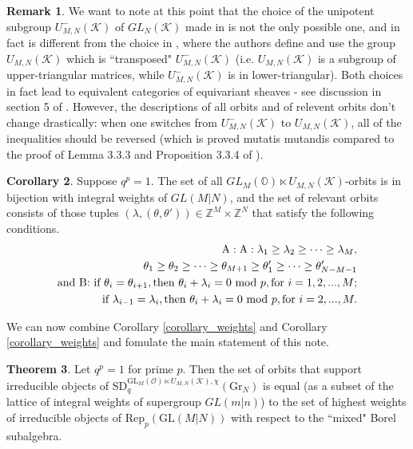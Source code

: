 \documentclass[12pt]{amsart}
\numberwithin{equation}{section}
\numberwithin{equation}{section}
\theoremstyle{definition}
\newtheorem{theorem}{Theorem}
\newtheorem{corollary}[theorem]{Corollary}
\newtheorem{remark}[theorem]{Remark}
\begin{document}
\begin{remark}
    We want to note at this point that the choice of the unipotent subgroup $U_{M,N}^-(\mathcal{K})$ of $GL_N(\mathcal{K})$ made in \cite{ty} is not the only possible one, and in fact is different from the choice in \cite{ty_untwisted}, where the authors define and use the group $U_{M,N}(\mathcal{K})$ which is ``transposed" $U_{M,N}^-(\mathcal{K})$ (i.e. $U_{M,N}(\mathcal{K})$ is a subgroup of upper-triangular matrices, while $U_{M,N}^-(\mathcal{K})$ is in lower-triangular). Both choices in fact lead to equivalent categories of equivariant sheaves - see discussion in section 5 of \cite{ty_untwisted}. However, the descriptions of all orbits and of relevent orbits don't change drastically: when one switches from $U_{M,N}^-(\mathcal{K})$ to $U_{M,N}(\mathcal{K})$, all of the inequalities should be reversed (which is proved mutatis mutandis compared to the proof of Lemma 3.3.3 and Proposition 3.3.4 of \cite{ty}).
\end{remark}

\begin{corollary}
\label{corollary_orbits} Suppose $q^p=1$. The set of all  $GL_M(\mathbb{O})\ltimes U_{M,N}(\mathcal{K})$-orbits is in bijection with integral weights of $GL(M|N)$, and the set of relevant orbits consists of those tuples $(\lambda,(\theta, \theta')) \in \mathbb{Z}^M\times \mathbb{Z}^N$ that satisfy the following conditions.
\begin{equation}\label{condition 3.4}
  \begin{split}
    \textnormal{A}:    \textnormal{A}:    \lambda_1\geq\lambda_2\geq\cdots\geq \lambda_M,\\
        \theta_{1}\geq \theta_2\geq\cdots\geq\theta_{M+1}\geq\theta'_1\geq\cdots \geq \theta'_{N-M-1}\\
        \textnormal{and B: if }  \theta_i=\theta_{i+1}, \textnormal{then } \theta_i+\lambda_i=0 \text{ mod }p, \textnormal{for } i=1,2,..., M;\\
        \textnormal{if } \lambda_{i-1}=\lambda_i, \textnormal{then } \theta_i+\lambda_i=0 \text{ mod }p, \textnormal{for } i=2,..., M.
    \end{split}
\end{equation}
\end{corollary}

We can now combine Corollary \ref{corollary_weights} and Corollary \ref{corollary_weights} and fomulate the main statement of this note.

\begin{theorem}
    Let $q^p=1$ for prime $p$. Then the set of orbits that support irreducible objects of $\mathrm{SD}_q^{\mathrm{GL}_M(\mathcal{O}) \ltimes U_{M,N}(\mathcal{K}), \chi}(\mathrm{Gr}_N)$ is equal (as a subset of the lattice of integral weights of supergroup $GL(m|n)$) to the set of highest weights of irreducible objects of $\mathrm{Rep}_p(\mathrm{GL}(M|N))$ with respect to the ``mixed" Borel subalgebra.
\end{theorem}
\end{document}
